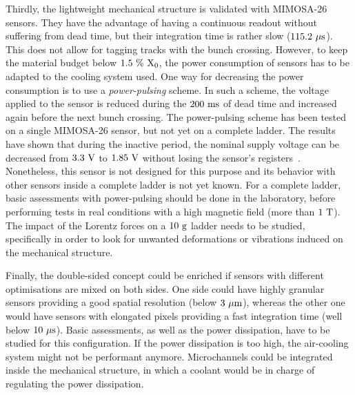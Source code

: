 Thirdly, the lightweight mechanical structure is validated with \gls{MIMOSA}-26 sensors.
They have the advantage of having a continuous readout without suffering from dead time, but their integration time is rather slow ($115.2~\rm{\mu s}$).
This does not allow for tagging tracks with the bunch crossing.
However, to keep the material budget below $1.5~\%~\rm{X_{0}}$, the power consumption of sensors has to be adapted to the cooling system used.
One way for decreasing the power consumption is to use a \textit{power-pulsing} scheme.
In such a scheme, the voltage applied to the sensor is reduced during the $200~\rm{ms}$ of dead time and increased again before the next bunch crossing.
The power-pulsing scheme has been tested on a single \gls{MIMOSA}-26 sensor, but not yet on a complete ladder.
The results have shown that during the inactive period, the nominal supply voltage can be decreased from $3.3~\rm{V}$ to $1.85~\rm{V}$ without losing the sensor's registers~\cite{Kuprash2013}.
Nonetheless, this sensor is not designed for this purpose and its behavior with other sensors inside a complete ladder is not yet known.
For a complete ladder, basic assessments with power-pulsing should be done in the laboratory, before performing tests in real conditions with a high magnetic field (more than $1~\rm{T}$).
The impact of the Lorentz forces on a $10~\rm{g}$ ladder needs to be studied, specifically in order to look for unwanted deformations or vibrations induced on the mechanical structure.

Finally, the double-sided concept could be enriched if sensors with different optimisations are mixed on both sides.
One side could have highly granular sensors providing a good spatial resolution (below $3~\rm{\mu m}$), whereas the other one would have sensors with elongated pixels providing a fast integration time (well below $10~\rm{\mu s}$).
Basic assessments, as well as the power dissipation, have to be studied for this configuration.
If the power dissipation is too high, the air-cooling system might not be performant anymore.
Microchannels could be integrated inside the mechanical structure, in which a coolant would be in charge of regulating the power dissipation.


